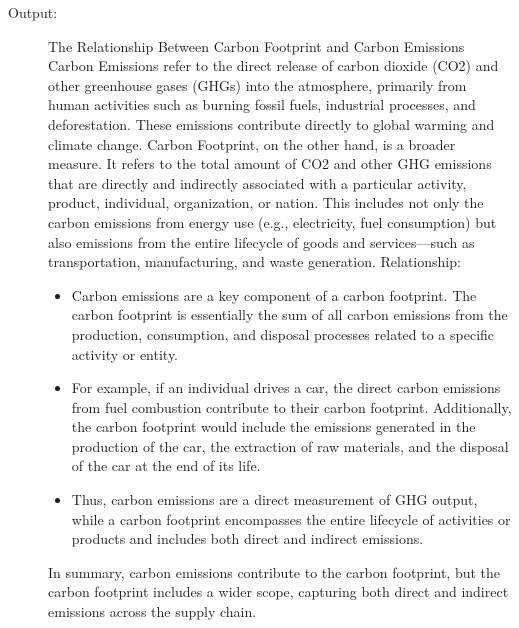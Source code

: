 \documentclass{mcmthesis}
\begin{document}
\begin{enumerate}
\begin{description}
\item[Output:] The Relationship Between Carbon Footprint and Carbon Emissions
Carbon Emissions refer to the direct release of carbon dioxide (CO2) and other greenhouse gases (GHGs) into the atmosphere, primarily from human activities such as burning fossil fuels, industrial processes, and deforestation. These emissions contribute directly to global warming and climate change.
Carbon Footprint, on the other hand, is a broader measure. It refers to the total amount of CO2 and other GHG emissions that are directly and indirectly associated with a particular activity, product, individual, organization, or nation. This includes not only the carbon emissions from energy use (e.g., electricity, fuel consumption) but also emissions from the entire lifecycle of goods and services—such as transportation, manufacturing, and waste generation.
Relationship:
\begin{itemize}
  \item Carbon emissions are a key component of a carbon footprint. The carbon footprint is essentially the sum of all carbon emissions from the production, consumption, and disposal processes related to a specific activity or entity.
  \item	For example, if an individual drives a car, the direct carbon emissions from fuel combustion contribute to their carbon footprint. Additionally, the carbon footprint would include the emissions generated in the production of the car, the extraction of raw materials, and the disposal of the car at the end of its life.
  \item	Thus, carbon emissions are a direct measurement of GHG output, while a carbon footprint encompasses the entire lifecycle of activities or products and includes both direct and indirect emissions.
  \end{itemize}
  In summary, carbon emissions contribute to the carbon footprint, but the carbon footprint includes a wider scope, capturing both direct and indirect emissions across the supply chain.
\end{description}
\end{enumerate}

\clearpage
\setcounter{page}{\value{lastpage}}
\end{document}
